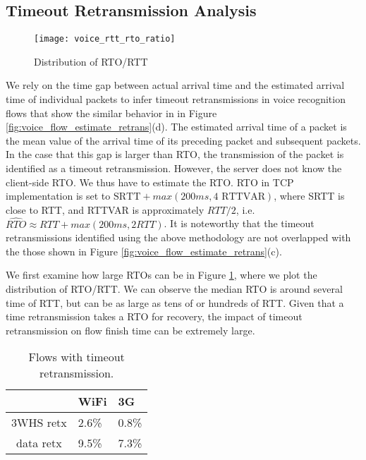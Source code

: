 \subsection{Timeout Retransmission Analysis}\label{sec:v_rto}

\begin{figure}[th]
\centering
	\texttt{[image: voice\_rtt\_rto\_ratio]}
\caption{Distribution of RTO/RTT}
\label{fig:rto_rtt}
\end{figure}

We rely on the time gap between actual arrival time and the estimated arrival time of individual packets to infer timeout retransmissions in voice recognition flows that show the similar behavior in in Figure \ref{fig:voice_flow_estimate_retrans}(d). The estimated arrival time of a packet is the mean value of the arrival time of its preceding packet and subsequent packets. In the case that this gap is larger than RTO, the transmission of the packet is identified as a timeout retransmission. However, the server does not know the client-side RTO. We thus have to estimate the RTO. RTO in TCP implementation is set to $\text{SRTT} + max(200ms, 4 \text{ RTTVAR})$\cite{rfc62982011computing}, where SRTT is close to RTT, and RTTVAR is approximately $RTT/2$, i.e. $\widehat{RTO} \approx RTT + max(200ms, 2 RTT)$. It is noteworthy that the timeout retransmissions identified using the above methodology are not overlapped with the those shown in Figure \ref{fig:voice_flow_estimate_retrans}(c).


We first examine how large RTOs can be in Figure \ref{fig:rto_rtt}, where we plot the distribution of RTO/RTT. We can observe the median RTO is around several time of RTT, but can be as large as tens of or hundreds of RTT. Given that a time retransmission takes a RTO for recovery, the impact of timeout retransmission on flow finish time can be extremely large.

\begin{table}[th]
\centering
\renewcommand{\arraystretch}{1.1}
\caption{Flows with timeout retransmission.}
\label{tab:voice_timeout_stats}
\begin{tabular}{c | C{2cm} | C{2cm}}
	\hline
	 & WiFi & 3G \\
	\hline
	3WHS retx & 2.6\% & 0.8\% \\
	data retx & 9.5\%  & 7.3\% \\
	\hline
\end{tabular}
\end{table}

